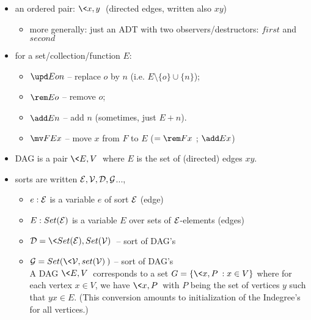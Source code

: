 \documentclass[leqno]{article}
\newcommand{\srt}[1]{{\cal #1}}
\begin{document}
\begin{itemize}
\item an ordered pair: $\<x,y\>$ (directed edges, written also $xy$)
 \begin{itemize}
 \item more generally: just an ADT with two observers/destructors: $first$ and $second$
 \end{itemize}
\item for a set/collection/function $E$: 
 \begin{itemize}
  \item  $\upd Eon$ -- replace $o$ by $n$ (i.e. $E\setminus\{o\}\cup\{n\}$);
  \item $\rem Eo$ -- remove $o$;
  \item $\add En$ -- add $n$ (sometimes, just $E+n$).
  \item $\mv FEx$ -- move $x$ from $F$ to $E$ ($=\rem Fx$ ; $\add Ex$)
 \end{itemize}
\item DAG is a pair $\<E,V\>$ where $E$ is the set of (directed) edges $xy$.
\item sorts are written $\srt E,\srt V, \srt D, \srt G$..., 
 \begin{itemize}
 \item $e:\srt E$ is a variable $e$ of sort $\srt E$ (edge)
 \item $E:Set(\srt E)$ is a variable $E$ over sets of $\srt E$-elements (edges)
 \item $\srt D = \<Set(\srt E),Set(\srt V)\>$ -- sort of DAG's 
 \item $\srt G = Set(\<\srt V,set(\srt V)\>)$ -- sort of DAG's \\
 A DAG $\<E,V\>$ corresponds to a set $G=\{\<x,P\>:x\in V\}$ where for each 
vertex $x\in V$, we have $\<x,P\>$ with 
$P$ being the set of vertices $y$ such that $yx\in E$.
(This conversion amounts to initialization of the Indegree's for all vertices.)
 \end{itemize}
\end{itemize}
\end{document}
